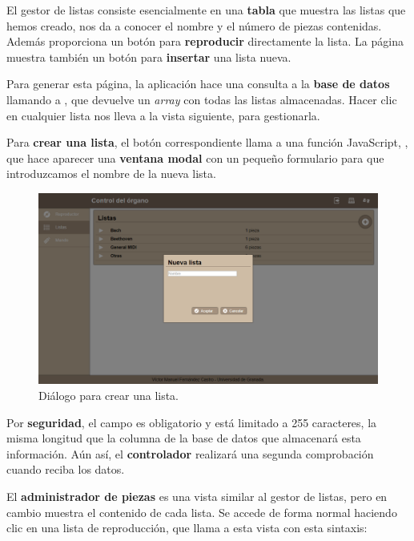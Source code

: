 \smallskip

El gestor de listas consiste esencialmente en una \textbf{tabla} que muestra las listas que hemos creado, nos da a conocer el nombre y el número de piezas contenidas. Además proporciona un botón para \textbf{reproducir} directamente la lista. La página muestra también un botón para \textbf{insertar} una lista nueva.

Para generar esta página, la aplicación hace una consulta a la \textbf{base de datos} llamando a , que devuelve un \textit{array} con todas las listas almacenadas. Hacer clic en cualquier lista nos lleva a la vista siguiente, para gestionarla.

Para \textbf{crear una lista}, el botón correspondiente llama a una función JavaScript, , que hace aparecer una \textbf{ventana modal} con un pequeño formulario para que introduzcamos el nombre de la nueva lista.

\smallskip

\begin{figure}[H]
	\noindent \begin{centering}
		\includegraphics[width=\linewidth*3/4]{capitulo5/cap_ins_lista}
		\par\end{centering}
	\smallskip
	\caption{\label{fig:cap_ins_lista} Diálogo para crear una lista.}
\end{figure} 

\smallskip

Por \textbf{seguridad}, el campo es obligatorio y está limitado a 255 caracteres, la misma longitud que la columna de la base de datos que almacenará esta información. Aún así, el \textbf{controlador} realizará una segunda comprobación cuando reciba los datos.

El \textbf{administrador de piezas} es una vista similar al gestor de listas, pero en cambio muestra el contenido de cada lista. Se accede de forma normal haciendo clic en una lista de reproducción, que llama a esta vista con esta sintaxis:

